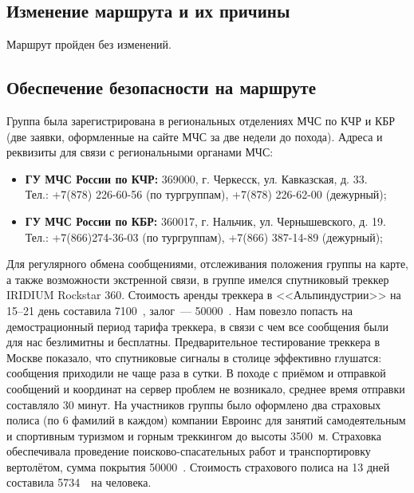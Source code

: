 \subsection{Изменение маршрута и их причины}
Маршрут пройден без изменений.
\subsection{Обеспечение безопасности на маршруте}
Группа была зарегистрирована в региональных отделениях МЧС по КЧР и КБР (две заявки, оформленные на сайте МЧС за две недели до похода).
Адреса и реквизиты для связи с региональными органами МЧС:
\begin{itemize}
	\item \textbf{ГУ МЧС России по КЧР:} 369000, г. Черкесск, ул. Кавказская, д. 33.\\
	Тел.: +7(878) 226-60-56 (по тургруппам), +7(878) 226-62-00 (дежурный);
	
	\item \textbf{ГУ МЧС России по КБР:} 360017, г. Нальчик, ул. Чернышевского, д. 19.\\
	Тел.: +7(866)274-36-03 (по тургруппам), +7(866) 387-14-89 (дежурный);	
\end{itemize}
Для регулярного обмена сообщениями, отслеживания положения группы на карте, а также возможности экстренной связи, в группе имелся спутниковый треккер IRIDIUM Rockstar 360. Стоимость аренды треккера в <<Альпиндустрии>> на 15--21 день составила 7100~\faRub, залог~--- 50000~\faRub. Нам повезло попасть на демострационный период тарифа треккера, в связи с чем все сообщения были для нас безлимитны и бесплатны. Предварительное тестирование треккера в Москве показало, что спутниковые сигналы в столице эффективно глушатся: сообщения приходили не чаще раза в сутки. В походе с приёмом и отправкой сообщений и координат на сервер проблем не возникало, среднее время отправки составляло 30 минут.
На участников группы было оформлено два страховых полиса (по 6 фамилий в каждом) компании Евроинс для
занятий самодеятельным и спортивным туризмом и горным треккингом до высоты 3500~м. Страховка обеспечивала проведение поисково-спасательных работ и транспортировку вертолётом, сумма покрытия 50000~\faEur. Стоимость страхового полиса на 13 дней составила 5734~\faRub~на человека.

